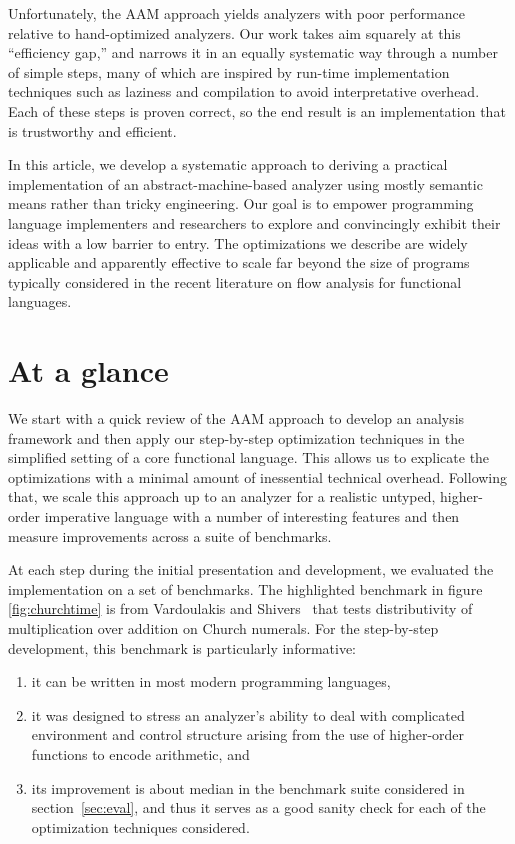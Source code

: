 \documentclass[9pt]{sigplanconf} %
\begin{document}
Unfortunately, the AAM approach yields analyzers with poor performance relative to hand-optimized analyzers.
%
Our work takes aim squarely at this ``efficiency gap,'' and narrows it in an equally systematic way through a number of simple steps, many of which are inspired by run-time implementation techniques such as laziness and compilation to avoid interpretative overhead.
%
Each of these steps is proven correct, so the end result is an implementation that is trustworthy and efficient.

In this article, we develop a systematic approach to deriving a practical implementation of an abstract-machine-based analyzer using mostly semantic means rather than tricky engineering.
%
Our goal is to empower programming language implementers and researchers to explore and convincingly exhibit their ideas with a low barrier to entry.
%
The optimizations we describe are widely applicable and apparently effective to scale far beyond the size of programs typically considered in the recent literature on flow analysis for functional languages.

\section{At a glance}

We start with a quick review of the AAM approach to develop an analysis framework and then apply our step-by-step optimization techniques in the simplified setting of a core functional language.
%
This allows us to explicate the optimizations with a minimal amount of inessential technical overhead.
%
Following that, we scale this approach up to an analyzer for a realistic untyped, higher-order imperative language with a number of interesting features and then measure improvements across a suite of benchmarks.

At each step during the initial presentation and development, we evaluated the implementation on a set of benchmarks.
%
The highlighted benchmark in figure \ref{fig:churchtime} is from Vardoulakis and Shivers~\cite{dvanhorn:Vardoulakis2011CFA2} that tests distributivity of multiplication over addition on Church numerals.
%
For the step-by-step development, this benchmark is particularly informative:
\begin{enumerate}
\item it can be written in most modern programming languages,
%
\item it was designed to stress an analyzer's ability to deal with complicated environment and control structure arising from the use of higher-order functions to encode arithmetic, and
%
\item its improvement is about median in the benchmark suite considered in section~\ref{sec:eval}, and thus it serves as a good sanity check for each of the optimization techniques considered.
\end{enumerate}
\end{document}
